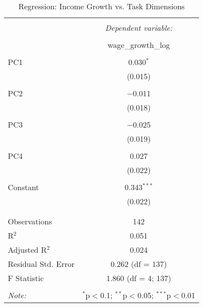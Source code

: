 
\begin{table}[!htbp] \centering 
  \caption{Regression: Income Growth vs. Task Dimensions} 
  \label{} 
\begin{tabular}{@{\extracolsep{5pt}}lc} 
\\[-1.8ex]\hline 
\hline \\[-1.8ex] 
 & \multicolumn{1}{c}{\textit{Dependent variable:}} \\ 
\cline{2-2} 
\\[-1.8ex] & wage\_growth\_log \\ 
\hline \\[-1.8ex] 
 PC1 & 0.030$^{*}$ \\ 
  & (0.015) \\ 
  & \\ 
 PC2 & $-$0.011 \\ 
  & (0.018) \\ 
  & \\ 
 PC3 & $-$0.025 \\ 
  & (0.019) \\ 
  & \\ 
 PC4 & 0.027 \\ 
  & (0.022) \\ 
  & \\ 
 Constant & 0.343$^{***}$ \\ 
  & (0.022) \\ 
  & \\ 
\hline \\[-1.8ex] 
Observations & 142 \\ 
R$^{2}$ & 0.051 \\ 
Adjusted R$^{2}$ & 0.024 \\ 
Residual Std. Error & 0.262 (df = 137) \\ 
F Statistic & 1.860 (df = 4; 137) \\ 
\hline 
\hline \\[-1.8ex] 
\textit{Note:}  & \multicolumn{1}{r}{$^{*}$p$<$0.1; $^{**}$p$<$0.05; $^{***}$p$<$0.01} \\ 
\end{tabular} 
\end{table} 
